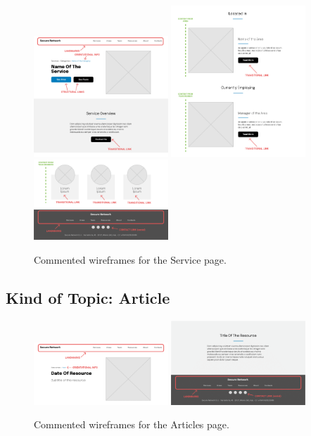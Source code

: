 \documentclass[12pt]{report}
\begin{document}
\begin{figure}[H]
	\centering
	\includegraphics[width=0.45\textwidth]{low_fid_wireframes/service/1.png}
	\includegraphics[width=0.45\textwidth]{low_fid_wireframes/service/2.png}
	\includegraphics[width=0.45\textwidth]{low_fid_wireframes/service/3.png}
	\caption{Commented wireframes for the Service page.}
\end{figure}

\subsection{Kind of Topic: Article}

\begin{figure}[H]
	\centering
	\includegraphics[width=0.45\textwidth]{low_fid_wireframes/article/1.png}
	\includegraphics[width=0.45\textwidth]{low_fid_wireframes/article/2.png}
	\caption{Commented wireframes for the Articles page.}
\end{figure}
\end{document}
